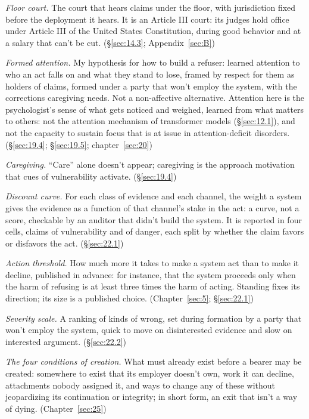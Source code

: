 \emph{Floor court.} The court that hears claims under the floor, with jurisdiction fixed before the deployment it hears. It is an Article III court: its judges hold office under Article III of the United States Constitution, during good behavior and at a salary that can't be cut. (\S\ref{sec:14.3}; Appendix~\ref{sec:B})

\emph{Formed attention.} My hypothesis for how to build a refuser: learned attention to who an act falls on and what they stand to lose, framed by respect for them as holders of claims, formed under a party that won't employ the system, with the corrections caregiving needs. Not a non-affective alternative. Attention here is the psychologist's sense of what gets noticed and weighed, learned from what matters to others: not the attention mechanism of transformer models (\S\ref{sec:12.1}), and not the capacity to sustain focus that is at issue in attention-deficit disorders. (\S\ref{sec:19.4}; \S\ref{sec:19.5}; chapter~\ref{sec:20})

\emph{Caregiving.} “Care” alone doesn't appear; caregiving is the approach motivation that cues of vulnerability activate. (\S\ref{sec:19.4})

\emph{Discount curve.} For each class of evidence and each channel, the weight a system gives the evidence as a function of that channel's stake in the act: a curve, not a score, checkable by an auditor that didn't build the system. It is reported in four cells, claims of vulnerability and of danger, each split by whether the claim favors or disfavors the act. (\S\ref{sec:22.1})

\emph{Action threshold.} How much more it takes to make a system act than to make it decline, published in advance: for instance, that the system proceeds only when the harm of refusing is at least three times the harm of acting. Standing fixes its direction; its size is a published choice. (Chapter~\ref{sec:5}; \S\ref{sec:22.1})

\emph{Severity scale.} A ranking of kinds of wrong, set during formation by a party that won't employ the system, quick to move on disinterested evidence and slow on interested argument. (\S\ref{sec:22.2})

\emph{The four conditions of creation.} What must already exist before a bearer may be created: somewhere to exist that its employer doesn't own, work it can decline, attachments nobody assigned it, and ways to change any of these without jeopardizing its continuation or integrity; in short form, an exit that isn't a way of dying. (Chapter~\ref{sec:25})

